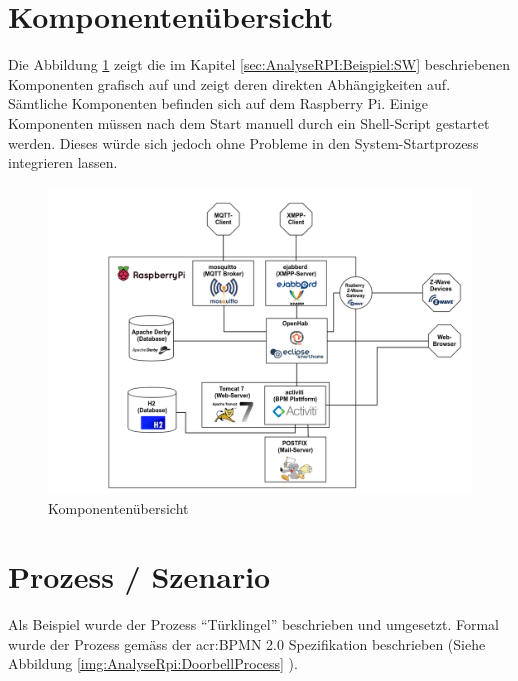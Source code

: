 \begin{itemize}

\end{itemize}


\section{Komponentenübersicht}
Die Abbildung \ref{img:AnalyseRpi:ComponentOverview}  zeigt die im Kapitel \ref{sec:AnalyseRPI:Beispiel:SW}  beschriebenen Komponenten grafisch auf und zeigt deren direkten Abhängigkeiten auf. Sämtliche Komponenten befinden sich auf dem Raspberry Pi. Einige Komponenten müssen nach dem Start manuell durch ein Shell-Script gestartet werden. Dieses würde sich jedoch ohne Probleme in den System-Startprozess integrieren lassen.

\begin{landscape}
\begin{figure}[H]
  \centering
  \includegraphics[width=19cm]{./images/Component-Overview}
  \caption{Komponentenübersicht}\label{img:AnalyseRpi:ComponentOverview}
\end{figure}
\end{landscape}

\section{Prozess / Szenario}
Als Beispiel wurde der Prozess "`Türklingel"' beschrieben und umgesetzt. Formal wurde der Prozess gemäss der \gls{acr:BPMN} 2.0 Spezifikation beschrieben (Siehe Abbildung \ref{img:AnalyseRpi:DoorbellProcess}  ). 

